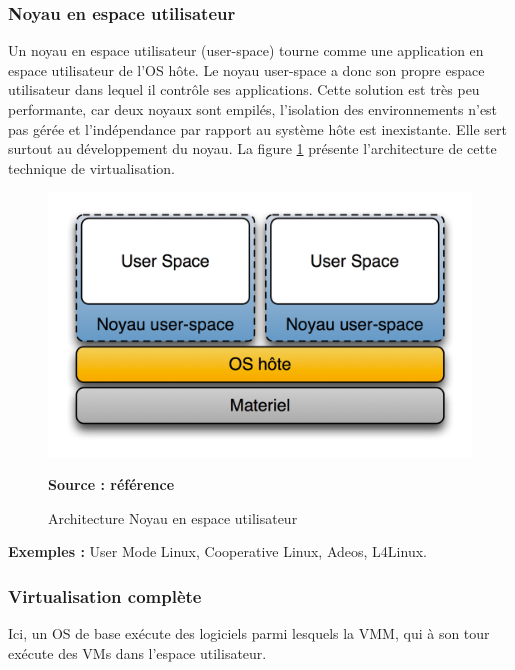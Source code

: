\subsubsection{Noyau en espace utilisateur}
Un noyau en espace utilisateur (user-space) tourne comme une application en espace utilisateur de l'OS hôte. Le noyau user-space a donc son propre espace utilisateur dans lequel il contrôle ses applications. Cette solution est très peu performante, car deux noyaux sont empilés, l’isolation des environnements n’est pas gérée et l’indépendance par rapport au système hôte est inexistante. Elle sert surtout au développement du noyau. La figure \ref{fig:noyau_espace_utilisateur} présente l'architecture de cette technique de virtualisation.
    \begin{figure}[H]
      \centering
      \includegraphics[scale=.8]{fig1/noyau_espace_utilisateur.png}
      \caption{Architecture Noyau en espace utilisateur}
      \label{fig:noyau_espace_utilisateur}
      \centering \bfseries Source : référence \cite{online2}
    \end{figure}
\noindent \textbf{Exemples :} User Mode Linux, Cooperative Linux, Adeos, L4Linux.
    
\subsubsection{Virtualisation complète}
Ici, un OS de base exécute des logiciels parmi lesquels la VMM, qui à son tour exécute des VMs dans l'espace utilisateur. 

